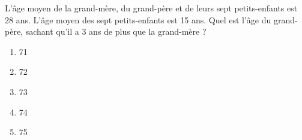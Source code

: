 L'âge moyen de la grand-mère, du grand-père et de leurs sept petits-enfants est 28 ans. L'âge moyen des sept petits-enfants est 15 ans. Quel est l'âge du grand-père, sachant qu'il a 3 ans de plus que la grand-mère ?
\begin{multicols}{5}
  \begin{enumerate}[A/]
  \item 71
  \item 72
  \item 73
  \item 74
  \item 75
  \end{enumerate}
\end{multicols}